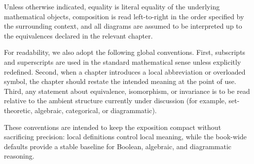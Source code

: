 Unless otherwise indicated, equality is literal equality of the underlying mathematical objects, composition is read left-to-right in the order specified by the surrounding context, and all diagrams are assumed to be interpreted up to the equivalences declared in the relevant chapter.

For readability, we also adopt the following global conventions. First, subscripts and superscripts are used in the standard mathematical sense unless explicitly redefined. Second, when a chapter introduces a local abbreviation or overloaded symbol, the chapter should restate the intended meaning at the point of use. Third, any statement about equivalence, isomorphism, or invariance is to be read relative to the ambient structure currently under discussion (for example, set-theoretic, algebraic, categorical, or diagrammatic).

These conventions are intended to keep the exposition compact without sacrificing precision: local definitions control local meaning, while the book-wide defaults provide a stable baseline for Boolean, algebraic, and diagrammatic reasoning.
